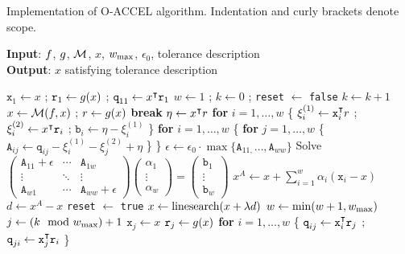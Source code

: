 \documentclass[main.tex]{subfiles}
\begin{document}
\begin{algorithm}[htb]
  \caption{Implementation of O-ACCEL algorithm. Indentation and curly
    brackets denote scope.}\label{alg:ngmreso_impl}
  \hspace*{\algorithmicindent} \textbf{Input}:
  $f$, $g$, $\mathcal{M}$, $x$, $w_{\textnormal{max}}$, $\epsilon_0$, tolerance
  description\\
  \hspace*{\algorithmicindent} \textbf{Output}:
  $x$ satisfying tolerance description
  \begin{algorithmic}[1]
    \State $\texttt{x}_1 \gets x$ ; $\texttt{r}_1\gets g(x)$ ; $\texttt{q}_{11}\gets
    x^\intercal\texttt{r}_1$
    \State $w\gets 1$ ; $k\gets 0$ ; \texttt{reset} $\gets$ \texttt{false}
    \State $k\gets k+1$
    \State $x \gets \mathcal{M}(f,x)$ ; $r\gets g(x)$
    \State \textbf{break}
    \EndIf
    \State $\eta \gets x^\intercal{r}$
    \State
    \textbf{for} $i=1,\dots,w$
    \{ $\xi^{(1)}_i\gets
    \texttt{x}_i^\intercal r$ ; $
    \xi^{(2)}_i\gets
    x^\intercal\texttt{r}_i$ ; $
    \texttt{b}_i\gets \eta-\xi^{(1)}_i$ \}
    \State
    \textbf{for} $i=1,\dots,w$ \{
    \textbf{for} $j = 1,\dots, w$
    \{ $\texttt{A}_{ij}\gets \texttt{q}_{ij}-\xi^{(1)}_i-\xi^{(2)}_j+\eta$ \} \}
    \State $\epsilon \gets \epsilon_0 \cdot \max\{\texttt{A}_{11,}\dots,\texttt{A}_{ww}\}$
    \State Solve
    $
    \begin{pmatrix}
      \texttt{A}_{11}+\epsilon&\cdots&\texttt{A}_{1w}\\
      \vdots&\ddots&\vdots\\
      \texttt{A}_{w1}&\cdots&\texttt{A}_{ww}+\epsilon
    \end{pmatrix}
    \begin{pmatrix}
      \alpha_1\\\vdots\\\alpha_w
    \end{pmatrix}
    = \begin{pmatrix}
      \texttt{b}_1\\\vdots\\\texttt{b}_w
    \end{pmatrix}$
    \State $x^A\gets  x +  \sum_{i=1}^w \alpha_i(\texttt{x}_i-x)$
    \State $d\gets x^A-x$
    \State \texttt{reset} $\gets$ \texttt{true}
    \Else
    \State $x\gets \textnormal{linesearch}(x+\lambda d)$
    \State $w\gets \min(w+1,w_{\textnormal{max}})$
    \State $j \gets (k \mod w_{\textnormal{max}}) + 1 $
    \State $\texttt{x}_j\gets x$
    \State $\texttt{r}_j\gets g(x)$
    \State \textbf{for} $i=1,\dots,w$
    \{ $\texttt{q}_{ij}\gets \texttt{x}_i^\intercal\texttt{r}_j$ ; $\texttt{q}_{ji}\gets \texttt{x}_j^\intercal\texttt{r}_i$ \}
    \EndIf
    \EndWhile
    \EndWhile
  \end{algorithmic}
\end{algorithm}
\end{document}
